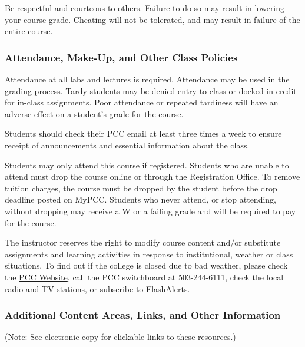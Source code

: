 \documentclass[11pt]{article}
\begin{document}
Be respectful and courteous to others. Failure to do so may result in
lowering your course grade. Cheating will not be tolerated, and may
result in failure of the entire course.

\hypertarget{attendance-make-up-and-other-class-policies}{%
\subsubsection{Attendance, Make-Up, and Other Class
Policies}\label{attendance-make-up-and-other-class-policies}}

Attendance at all labs and lectures is required. Attendance may be used
in the grading process. Tardy students may be denied entry to class or
docked in credit for in-class assignments. Poor attendance or repeated
tardiness will have an adverse effect on a student's grade for the
course.

Students should check their PCC email at least three times a week to
ensure receipt of announcements and essential information about the
class.

Students may only attend this course if registered. Students who are
unable to attend must drop the course online or through the Registration
Office. To remove tuition charges, the course must be dropped by the
student before the drop deadline posted on MyPCC. Students who never
attend, or stop attending, without dropping may receive a W or a failing
grade and will be required to pay for the course.

The instructor reserves the right to modify course content and/or
substitute assignments and learning activities in response to
institutional, weather or class situations. To find out if the college
is closed due to bad weather, please check the
\href{http://www.pcc.edu/}{PCC Website}, call the PCC switchboard at
503-244-6111, check the local radio and TV stations, or subscribe to
\href{https://www.pcc.edu/about/announcements/closure-information.html}{FlashAlerts}.

    \hypertarget{additional-content-areas-links-and-other-information}{%
\subsubsection{Additional Content Areas, Links, and Other
Information}\label{additional-content-areas-links-and-other-information}}

(Note: See electronic copy for clickable links to these resources.)
\end{document}
